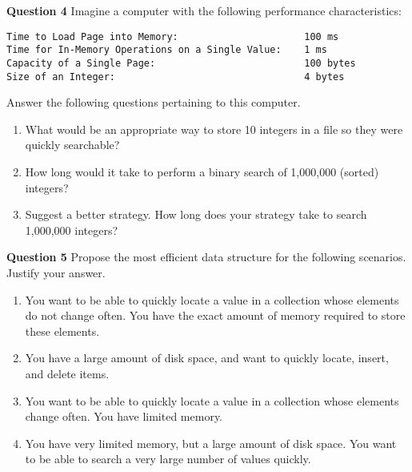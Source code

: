 \documentclass{letter}
\begin{document}
\clearpage

{\bf Question 4} \kern 1cm Imagine a computer with the following performance
characteristics:

\begin{verbatim}
Time to Load Page into Memory:                      100 ms
Time for In-Memory Operations on a Single Value:    1 ms
Capacity of a Single Page:                          100 bytes
Size of an Integer:                                 4 bytes
\end{verbatim}

Answer the following questions pertaining to this computer.

\begin{enumerate}[label=(\alph*)]

\item What would be an appropriate way to store 10 integers in a file so they
were quickly searchable?

\vspace{5cm}

\item How long would it take to perform a binary search of 1,000,000 (sorted)
integers?

\vspace{5cm}

\item Suggest a better strategy.  How long does your strategy take to search
1,000,000 integers?

\end{enumerate}

\clearpage

{\bf Question 5} \kern 1cm Propose the most efficient data structure for the
following scenarios.  Justify your answer.

\begin{enumerate}[label=(\alph*)]

\item You want to be able to quickly locate a value in a collection whose
elements do not change often.  You have the exact amount of memory
required to store these elements.

\vspace{4cm}

\item You have a large amount of disk space, and want to quickly locate,
insert, and delete items.

\vspace{4cm}

\item You want to be able to quickly locate a value in a collection whose
elements change often.  You have limited memory. 

\vspace{4cm}

\item You have very limited memory, but a large amount of disk space.  You want
to be able to search a very large number of values quickly.

\end{enumerate}
\end{document}
